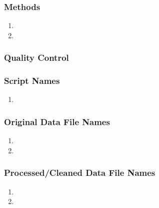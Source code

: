 \subsubsection*{Methods}

\begin{enumerate}
\item 
\item
\end{enumerate}

\subsubsection*{Quality Control}

\subsubsection*{Script Names}

\begin{enumerate}
\item 
\end{enumerate}

\subsubsection*{Original Data File Names}

\begin{enumerate}
\item 
\item 
\end{enumerate}

\subsubsection*{Processed/Cleaned Data File Names}

\begin{enumerate}
\item 
\item 
\end{enumerate}
